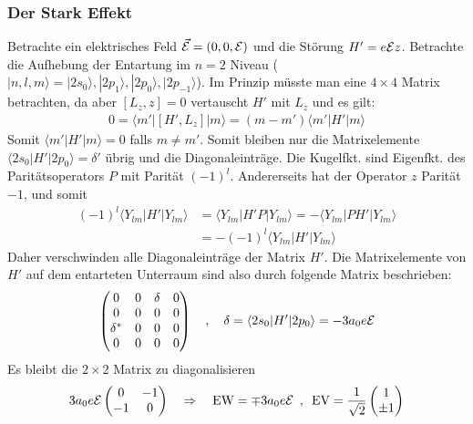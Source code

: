 \subsubsection{Der Stark Effekt}
Betrachte ein elektrisches Feld $\vec{\mathcal{E}} = (0,0,\mathcal{E})$ und die Störung
$H' = e \mathcal{E} z$. Betrachte die Aufhebung der Entartung im $n=2$ Niveau
($|n,l,m\rangle = |2s_0\rangle,|2p_1\rangle,|2p_0\rangle,|2p_{-1}\rangle$).
Im Prinzip müsste man eine $4 \times 4$ Matrix betrachten, da aber $[L_z,z] =0$
vertauscht $H'$ mit $L_z$ und es gilt:
\begin{align*}
    0 = \langle m' | [H',L_z] | m \rangle = (m-m') \langle m' | H' | m \rangle
\end{align*}
Somit $\langle m' | H' | m \rangle = 0$ falls $m \neq m'$. Somit bleiben nur
die Matrixelemente $\langle 2s_0 | H' | 2p_0 \rangle = \delta'$ übrig und die
Diagonaleinträge. Die Kugelfkt. sind Eigenfkt. des Paritätsoperators $P$ mit
Parität $(-1)^l$. Andererseits hat der Operator $z$ Parität $-1$, und somit
\begin{align*}
    (-1)^l \langle Y_{lm} | H' | Y_{lm} \rangle
    &= \langle Y_{lm} | H' P | Y_{lm} \rangle
    = - \langle Y_{lm} | P H' | Y_{lm} \rangle
    \\
    &= - (-1)^l \langle Y_{lm} | H' | Y_{lm} \rangle
\end{align*}
Daher verschwinden alle Diagonaleinträge der Matrix $H'$. Die Matrixelemente
von $H'$ auf dem entarteten Unterraum sind also durch folgende Matrix
beschrieben:
\begin{align*}
    \begin{pmatrix}
        0 & 0 & \delta & 0 \\
        0 & 0 & 0 & 0 \\
        \delta^\ast & 0 & 0 & 0 \\
        0 & 0 & 0 & 0
    \end{pmatrix}
    \hspace{10pt} , \hspace{10pt}
    \delta = \langle 2s_0 | H' | 2p_0 \rangle = - 3 a_0 e \mathcal{E}
\end{align*}
Es bleibt die $2 \times 2$ Matrix zu diagonalisieren
\begin{align*}
    3 a_0e \mathcal{E} \begin{pmatrix}
        0 & -1 \\ -1 & 0
    \end{pmatrix}
    \hspace{10pt} \Rightarrow \hspace{10pt}
    \text{EW} = \mp 3 a_0 e \mathcal{E}
    \hspace{5pt} , \hspace{5pt}
    \text{EV} = \frac{1}{\sqrt{2}} \begin{pmatrix}
        1 \\ \pm 1
    \end{pmatrix}
\end{align*}

